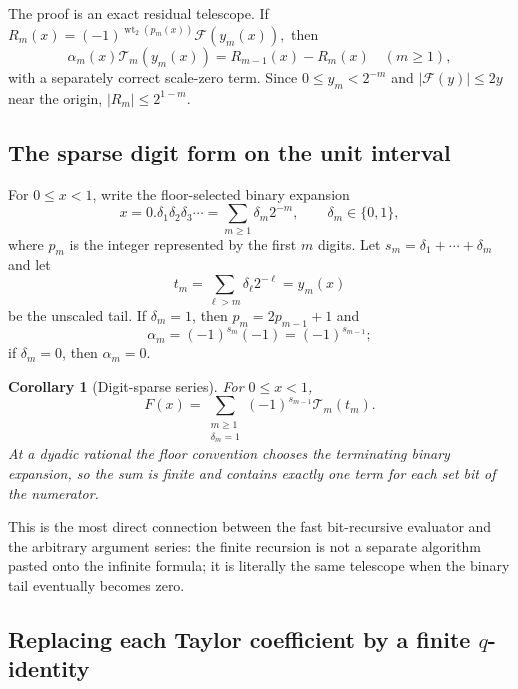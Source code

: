 \documentclass[11pt,oneside]{article}
\newtheorem{corollary}[theorem]{Corollary}
\theoremstyle{definition}
\theoremstyle{remark}
\newcommand{\wt}{\operatorname{wt}_2}
\begin{document}
The proof is an exact residual telescope.  If
\(
 R_m(x)=(-1)^{\wt(p_m(x))}\mathcal F(y_m(x)),
\)
then
\[
 \alpha_m(x)\mathcal T_m(y_m(x))=R_{m-1}(x)-R_m(x)
 \quad(m\ge1),
\]
with a separately correct scale-zero term.  Since $0\le y_m<2^{-m}$ and
$|\mathcal F(y)|\le2y$ near the origin, $|R_m|\le2^{1-m}$.

\subsection{The sparse digit form on the unit interval}

For $0\le x<1$, write the floor-selected binary expansion
\begin{equation}
 x=0.\delta_1\delta_2\delta_3\cdots
 =\sum_{m\ge1}\delta_m2^{-m},
 \qquad \delta_m\in\{0,1\},                               \label{eq:binary-digits}
\end{equation}
where $p_m$ is the integer represented by the first $m$ digits.  Let
\(
 s_m=\delta_1+\cdots+\delta_m
\)
and let
\begin{equation}
 t_m=\sum_{\ell>m}\delta_\ell2^{-\ell}=y_m(x)             \label{eq:binary-tail-digits}
\end{equation}
be the unscaled tail.  If $\delta_m=1$, then
$p_m=2p_{m-1}+1$ and
\[
 \alpha_m=(-1)^{s_m}(-1)=(-1)^{s_{m-1}};
\]
if $\delta_m=0$, then $\alpha_m=0$.

\begin{corollary}[Digit-sparse series]
\label{cor:digit-sparse}
For $0\le x<1$,
\begin{equation}
 \boxed{
 F(x)=\sum_{\substack{m\ge1\\\delta_m=1}}
 (-1)^{s_{m-1}}\mathcal T_m(t_m).}                         \label{eq:digit-sparse}
\end{equation}
At a dyadic rational the floor convention chooses the terminating binary expansion, so the
sum is finite and contains exactly one term for each set bit of the numerator.
\end{corollary}

This is the most direct connection between the fast bit-recursive evaluator and the arbitrary
argument series: the finite recursion is not a separate algorithm pasted onto the infinite
formula; it is literally the same telescope when the binary tail eventually becomes zero.

\subsection[Replacing each Taylor coefficient by a finite q-identity]{Replacing each Taylor coefficient by a finite $q$-identity}
\end{document}
